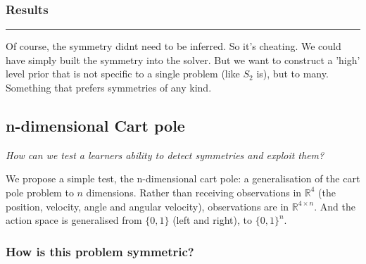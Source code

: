 \subsubsection{Results}



\begin{center}\rule{0.5\linewidth}{\linethickness}\end{center}

Of course, the symmetry didnt need to be inferred. So it's cheating.
We could have simply built the symmetry into the solver. But we want to
construct a 'high' level prior that is not specific to a single problem (like $S_2$ is), but
to many. Something that prefers symmetries of any kind.

\subsection{n-dimensional Cart pole}\label{action-space-experiments}

\begin{displayquote}
  \textit{How can we test a learners ability to detect symmetries and exploit them?}
\end{displayquote}

We propose a simple test, the n-dimensional cart pole: a generalisation of the
cart pole problem to $n$ dimensions. Rather than receiving observations in
$\mathbb{R}^4$ (the position, velocity, angle and angular velocity), observations are
in $\mathbb{R}^{4\times n}$. And the action space is generalised from $\{0,1\}$ (left and right),
to $\{0,1\}^{n}$.


\subsubsection{How is this problem symmetric?}

